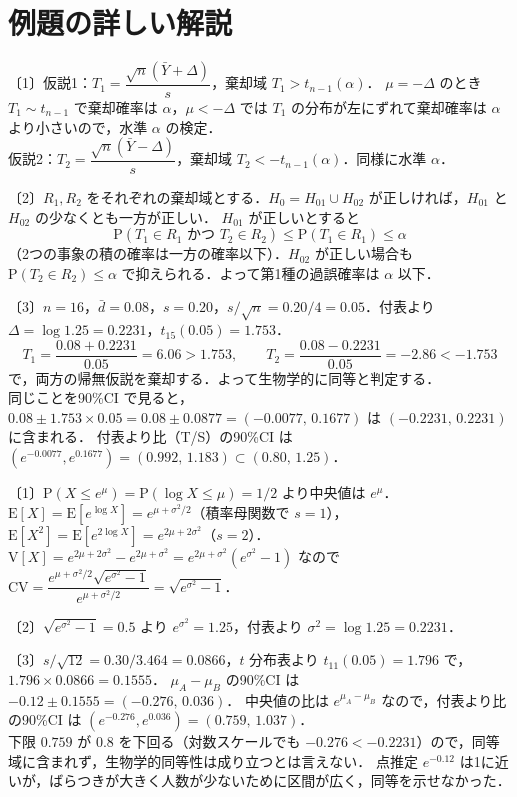 \documentclass[a4paper,11pt,openany]{ltjsbook}
\newenvironment{kaitou}[1]{%
  \par\medskip\noindent
  \begin{tcolorbox}[enhanced,breakable,colback=bkgray!3,colframe=bkgray!60,boxrule=0.4pt,
    left=4pt,right=4pt,top=2pt,bottom=2pt,arc=1pt,
    title={\cref{#1}の解答},fonttitle=\bfseries\small,coltitle=white,colbacktitle=bkgray!80]}%
  {\end{tcolorbox}\par}
\newcommand{\E}{\mathrm{E}}
\newcommand{\V}{\mathrm{V}}
\newcommand{\Prob}{\mathrm{P}}
\begin{document}
\section{例題の詳しい解説}\label{sec:m10-kaisetsu}
\begin{kaitou}{reidai:m10-1}
〔1〕仮説1：$T_1=\dfrac{\sqrt n(\bar Y+\Delta)}{s}$，棄却域 $T_1>t_{n-1}(\alpha)$．
$\mu=-\Delta$ のとき $T_1\sim t_{n-1}$ で棄却確率は $\alpha$，$\mu<-\Delta$ では $T_1$ の分布が左にずれて棄却確率は $\alpha$ より小さいので，水準 $\alpha$ の検定．\\
仮説2：$T_2=\dfrac{\sqrt n(\bar Y-\Delta)}{s}$，棄却域 $T_2<-t_{n-1}(\alpha)$．同様に水準 $\alpha$．

〔2〕$R_1,R_2$ をそれぞれの棄却域とする．$H_0=H_{01}\cup H_{02}$ が正しければ，$H_{01}$ と $H_{02}$ の少なくとも一方が正しい．
$H_{01}$ が正しいとすると
\[
\Prob(T_1\in R_1\text{ かつ }T_2\in R_2)\le\Prob(T_1\in R_1)\le\alpha
\]
（2つの事象の積の確率は一方の確率以下）．$H_{02}$ が正しい場合も $\Prob(T_2\in R_2)\le\alpha$ で抑えられる．よって第1種の過誤確率は $\alpha$ 以下．

〔3〕$n=16$，$\bar d=0.08$，$s=0.20$，$s/\sqrt n=0.20/4=0.05$．付表より $\Delta=\log1.25=0.2231$，$t_{15}(0.05)=1.753$．
\[
T_1=\frac{0.08+0.2231}{0.05}=6.06>1.753,\qquad T_2=\frac{0.08-0.2231}{0.05}=-2.86<-1.753
\]
で，両方の帰無仮説を棄却する．よって生物学的に同等と判定する．\\
同じことを90\%CI で見ると，$0.08\pm1.753\times0.05=0.08\pm0.0877=(-0.0077,\,0.1677)$ は $(-0.2231,\,0.2231)$ に含まれる．
付表より比（T/S）の90\%CI は $(e^{-0.0077},e^{0.1677})=(0.992,\,1.183)\subset(0.80,\,1.25)$．
\end{kaitou}

\begin{kaitou}{reidai:m10-2}
〔1〕$\Prob(X\le e^\mu)=\Prob(\log X\le\mu)=1/2$ より中央値は $e^\mu$．
$\E[X]=\E[e^{\log X}]=e^{\mu+\sigma^2/2}$（積率母関数で $s=1$），$\E[X^2]=\E[e^{2\log X}]=e^{2\mu+2\sigma^2}$（$s=2$）．
$\V[X]=e^{2\mu+2\sigma^2}-e^{2\mu+\sigma^2}=e^{2\mu+\sigma^2}(e^{\sigma^2}-1)$ なので
$\mathrm{CV}=\dfrac{e^{\mu+\sigma^2/2}\sqrt{e^{\sigma^2}-1}}{e^{\mu+\sigma^2/2}}=\sqrt{e^{\sigma^2}-1}$．

〔2〕$\sqrt{e^{\sigma^2}-1}=0.5$ より $e^{\sigma^2}=1.25$，付表より $\sigma^2=\log1.25=0.2231$．

〔3〕$s/\sqrt{12}=0.30/3.464=0.0866$，$t$ 分布表より $t_{11}(0.05)=1.796$ で，$1.796\times0.0866=0.1555$．
$\mu_A-\mu_B$ の90\%CI は $-0.12\pm0.1555=(-0.276,\,0.036)$．
中央値の比は $e^{\mu_A-\mu_B}$ なので，付表より比の90\%CI は $(e^{-0.276},e^{0.036})=(0.759,\,1.037)$．\\
下限 $0.759$ が $0.8$ を下回る（対数スケールでも $-0.276<-0.2231$）ので，同等域に含まれず，生物学的同等性は成り立つとは言えない．
点推定 $e^{-0.12}$ は1に近いが，ばらつきが大きく人数が少ないために区間が広く，同等を示せなかった．
\end{kaitou}
\end{document}
